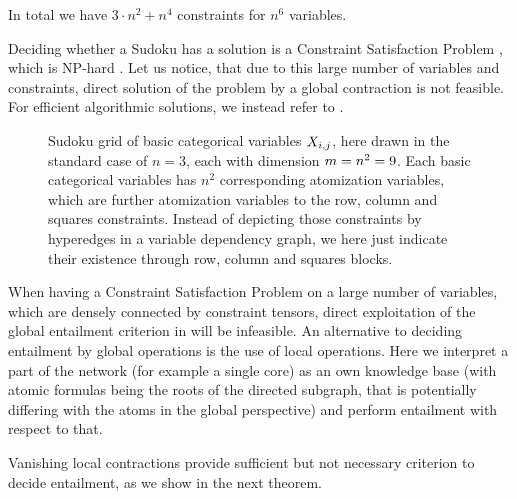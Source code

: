 \begin{example}[Sudoku]
    In total we have $3\cdot n^2 + n^4$ constraints for $n^6$ variables.

    Deciding whether a Sudoku has a solution is a Constraint Satisfaction Problem \cite{simonis_sudoku_2005}, which is NP-hard \cite{agerbeck_multi-agent_2008}.
    Let us notice, that due to this large number of variables and constraints, direct solution of the problem by a global contraction is not feasible.
    For efficient algorithmic solutions, we instead refer to .

    \begin{figure}
        \begin{center}
            
        \end{center}
        \caption{
            Sudoku grid of basic categorical variables $X_{i,j}$, here drawn in the standard case of $n=3$, each with dimension $m=n^2=9$.
            Each basic categorical variables has $n^2$ corresponding atomization variables, which are further atomization variables to the row, column and squares constraints.
            Instead of depicting those constraints by hyperedges in a variable dependency graph, we here just indicate their existence through row, column and squares blocks.
        }\label{fig:sudokuGrid}
    \end{figure}
\end{example}




\label{subsec:LocalEntailment}

When having a Constraint Satisfaction Problem on a large number of variables, which are densely connected by constraint tensors, direct exploitation of the global entailment criterion in  will be infeasible.
An alternative to deciding entailment by global operations is the use of local operations.
Here we interpret a part of the network (for example a single core) as an own knowledge base (with atomic formulas being the roots of the directed subgraph, that is potentially differing with the atoms in the global perspective) and perform entailment with respect to that.


Vanishing local contractions provide sufficient but not necessary criterion to decide entailment, as we show in the next theorem.

